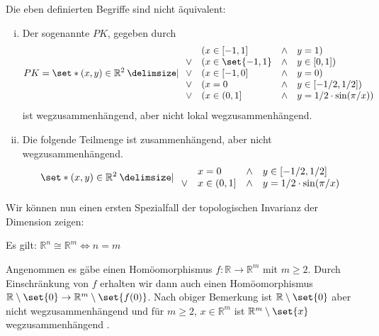 \begin{beispiel}[{name=[Polnischer Kreis]}]
	Die eben definierten Begriffe sind nicht äquivalent:
	\begin{enumerate}[(i)]
		\item Der sogenannte  $PK$, gegeben durch
		\[
			PK = \set*{(x,y) \in \mathbb{R}^2 \given  \begin{array}{rlcl}
				 & (x \in [{-1,1}] &\wedge& y=1) \\
				\vee & (x \in \set{-1,1} &\wedge& y \in [0,1])  \\
				\vee & (x \in [-1,0] & \wedge& y = 0) \\
				\vee & (x=0 & \wedge & y \in [-1/2, 1/2]) \\
				\vee & (x \in (0,1] & \wedge& y= 1/2 \cdot \sin (\pi/x))
			\end{array}}
		\]
		ist wegzusammenhängend, aber nicht lokal wegzusammenhängend.
		\item Die folgende Teilmenge ist zusammenhängend, aber nicht wegzusammenhängend.
		\[
			\set*{(x,y) \in \mathbb{R}^2 \given  \begin{array}{rlcl}
						 & x=0 & \wedge & y \in [-1/2, 1/2] \\
						\vee & x \in (0,1] & \wedge& y= 1/2 \cdot \sin (\pi/x)
					\end{array}}
		\]
	\end{enumerate}
	\begin{figure}[thbp]
	\end{figure}
\end{beispiel}

Wir können nun einen ersten Spezialfall der topologischen Invarianz der Dimension zeigen:
\begin{satz}[{name=[topologische Invarianz der Dimension]}]
	Es gilt: $\mathbb{R}^n \cong \mathbb{R}^m \iff n=m$
\end{satz}
\begin{beweis}[{name={für $n=1$}}]
	Angenommen es gäbe einen Homöomorphismus $f \colon \mathbb{R} \to \mathbb{R}^m$ mit $m \ge 2$. 
	Durch Einschränkung von $f$ erhalten wir dann auch einen Homöomorphismus $\mathbb{R} \setminus\set{0} \to \mathbb{R}^m \setminus \set{f(0)}$. 
	Nach obiger Bemerkung ist $\mathbb{R} \setminus \set{0}$ aber nicht wegzusammenhängend und für $m \ge 2$, $x \in \mathbb{R}^m$ ist $\mathbb{R}^m \setminus \set{x}$ wegzusammenhängend \light.
\end{beweis}

